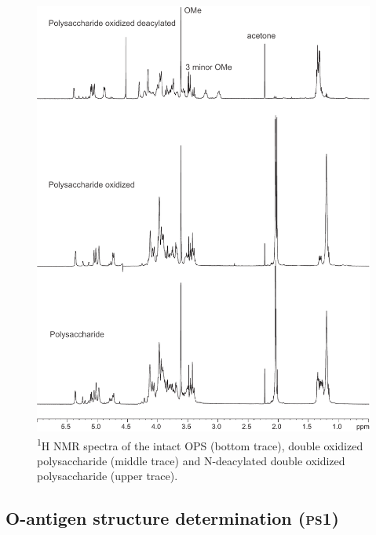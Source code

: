 		\begin{figure}[ph]  %
			\begin{center}
				\includegraphics[height=0.9\textheight]{lps_chapter/img/lpsfig1.pdf}
			\end{center}
			\caption[\textsuperscript{1}H \ac{NMR} spectra of \caulobacter{} \ac{OPS}]{\textsuperscript{1}H \ac{NMR} spectra of the intact \caulobacter{} \ac{OPS}  (bottom trace), double oxidized polysaccharide (middle trace) and N-deacylated double oxidized polysaccharide (upper trace).}
			\label{fig:lpsfig1}
		\end{figure}

	\subsection{O-antigen structure determination (\textsc{ps}1)} %
	\label{sub:o_antigen_structure_determination_ps1_}

